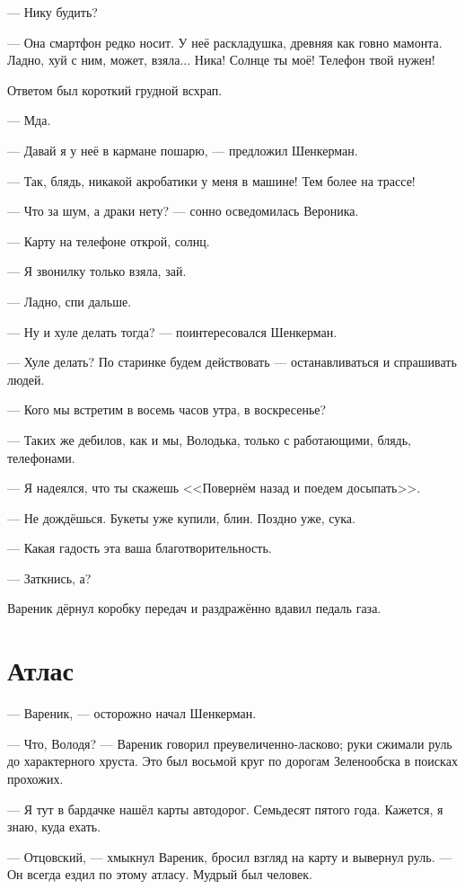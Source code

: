 \documentclass[a4paper,10pt,fleqn]{book}\usepackage{polyglossia}\setdefaultlanguage{english}\setotherlanguage{russian}\defaultfontfeatures{Ligatures=TeX,Mapping=tex-text} \usepackage{xcolor}\definecolor{lightgray}{HTML}{bbbbbb}\color{lightgray}\newcommand{\ml}[3]{\textcolor{black}{#3}}
\begin{document}
--- Нику будить?

--- Она смартфон редко носит.
У неё раскладушка, древняя как говно мамонта.
Ладно, хуй с ним, может, взяла...
Ника!
Солнце ты моё!
Телефон твой нужен!

Ответом был короткий грудной всхрап.

--- Мда.

--- Давай я у неё в кармане пошарю, --- предложил Шенкерман.

--- Так, блядь, никакой акробатики у меня в машине!
Тем более на трассе!

--- Что за шум, а драки нету? --- сонно осведомилась Вероника.

--- Карту на телефоне открой, солнц.

--- Я звонилку только взяла, зай.

--- Ладно, спи дальше.

--- Ну и хуле делать тогда? --- поинтересовался Шенкерман.

--- Хуле делать?
По старинке будем действовать --- останавливаться и спрашивать людей.

--- Кого мы встретим в восемь часов утра, в воскресенье?

--- Таких же дебилов, как и мы, Володька, только с работающими, блядь, телефонами.

--- Я надеялся, что ты скажешь <<Повернём назад и поедем досыпать>>.

--- Не дождёшься.
Букеты уже купили, блин.
Поздно уже, сука.

--- Какая гадость эта ваша благотворительность.

--- Заткнись, а?

Вареник дёрнул коробку передач и раздражённо вдавил педаль газа.

\section{Атлас}

--- Вареник, --- осторожно начал Шенкерман.

--- Что, Володя? --- Вареник говорил преувеличенно-ласково;
руки сжимали руль до характерного хруста.
Это был восьмой круг по дорогам Зеленообска в поисках прохожих.

--- Я тут в бардачке нашёл карты автодорог.
Семьдесят пятого года.
Кажется, я знаю, куда ехать.

--- Отцовский, --- хмыкнул Вареник, бросил взгляд на карту и вывернул руль.
--- Он всегда ездил по этому атласу.
Мудрый был человек.
\end{document}
